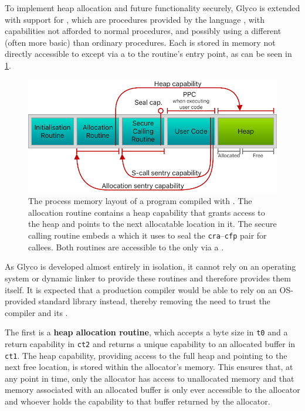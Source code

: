 \documentclass[main.tex]{subfiles}
\begin{document}
To implement heap allocation and future functionality securely, Glyco is extended with support for , which are procedures provided by the language , with capabilities not afforded to normal procedures, and possibly using a different (often more basic)  than ordinary procedures. Each  is stored in memory not directly accessible to  except via a  to the routine's entry point, as can be seen in \cref{fig:procmem}.

\begin{figure}
	\begin{center}
		\includegraphics{Images/GHSCC Process Memory.pdf}
	\end{center}
	\caption{The process memory layout of a program compiled with . The allocation routine contains a heap capability that grants access to the heap and points to the next allocatable location in it. The secure calling routine embeds a  which it uses to seal the \texttt{cra}–\texttt{cfp} pair for callees. Both routines are accessible to the  only via a .}
	\label{fig:procmem}
\end{figure}

As Glyco is developed almost entirely in isolation, it cannot rely on an operating system or dynamic linker to provide these routines and therefore provides them itself. It is expected that a production compiler would be able to rely on an OS-provided standard library instead, thereby removing the need to trust the compiler and its .

The first  is a \textbf{heap allocation routine}, which accepts a byte size in \texttt{t0} and a return capability in \texttt{ct2} and returns a unique capability to an allocated buffer in \texttt{ct1}. The heap capability, providing access to the full heap and pointing to the next free location, is stored within the allocator's memory. This ensures that, at any point in time, only the allocator has access to unallocated memory and that memory associated with an allocated buffer is only ever accessible to the allocator and whoever holds the capability to that buffer returned by the allocator.
\end{document}
